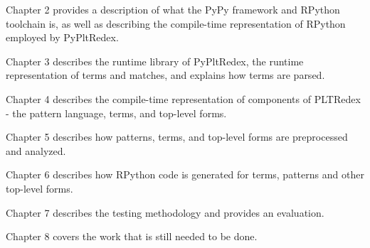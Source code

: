 Chapter 2 provides a description of what the PyPy framework and RPython toolchain is, as well as describing the compile-time representation of RPython employed by PyPltRedex.

Chapter 3 describes the runtime library of PyPltRedex, the runtime representation of terms and matches, and explains how terms are parsed.

Chapter 4 describes the compile-time representation of components of PLTRedex - the pattern language, terms, and top-level forms.

Chapter 5 describes how patterns, terms, and top-level forms are preprocessed and analyzed.

Chapter 6 describes how RPython code is generated for terms, patterns and other top-level forms.

Chapter 7 describes the testing methodology and provides an evaluation. 

Chapter 8 covers the work that is still needed to be done.



